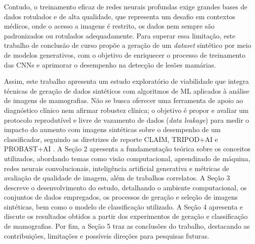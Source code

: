 \documentclass[
	12pt,				%
	openright,			%
	oneside,			%
	a4paper,			%
	tcc,			%
	]{ABNT-DC-UEL}
\begin{document}
Contudo, o treinamento eficaz de redes neurais profundas exige grandes bases de dados rotulados e de alta qualidade, que representa um desafio em contextos médicos, onde o acesso a imagens é restrito, os dados nem sempre são padronizados ou rotulados adequadamente. Para superar essa limitação, este trabalho de conclusão de curso propõe a geração de um \textit{dataset} sintético por meio de modelos generativos, com o objetivo de enriquecer o processo de treinamento das CNNs e aprimorar o desempenho na detecção de lesões mamárias.

Assim, este trabalho apresenta um estudo exploratório de viabilidade que integra técnicas de geração de dados sintéticos com algoritmos de ML aplicados à análise de imagens de mamografias. Não se busca oferecer uma ferramenta de apoio ao diagnóstico clínico nem afirmar robustez clínica; o objetivo é propor e avaliar um protocolo reprodutível e livre de vazamento de dados (\textit{data leakage}) para medir o impacto do aumento com imagens sintéticas sobre o desempenho de um classificador, seguindo as diretrizes de reporte CLAIM, TRIPOD+AI e PROBAST+AI \cite{mongan2020claim,collins2024tripodai,moons2024probastai}. A Seção 2 apresenta a fundamentação teórica sobre os conceitos utilizados, abordando temas como visão computacional, aprendizado de máquina, redes neurais convolucionais, inteligência artificial generativa e métricas de avaliação de qualidade de imagem, além de trabalhos correlatos. A Seção 3 descreve o desenvolvimento do estudo, detalhando o ambiente computacional, os conjuntos de dados empregados, os processos de geração e seleção de imagens sintéticas, bem como o modelo de classificação utilizado. A Seção 4 apresenta e discute os resultados obtidos a partir dos experimentos de geração e classificação de mamografias. Por fim, a Seção 5 traz as conclusões do trabalho, destacando as contribuições, limitações e possíveis direções para pesquisas futuras.


\end{document}
